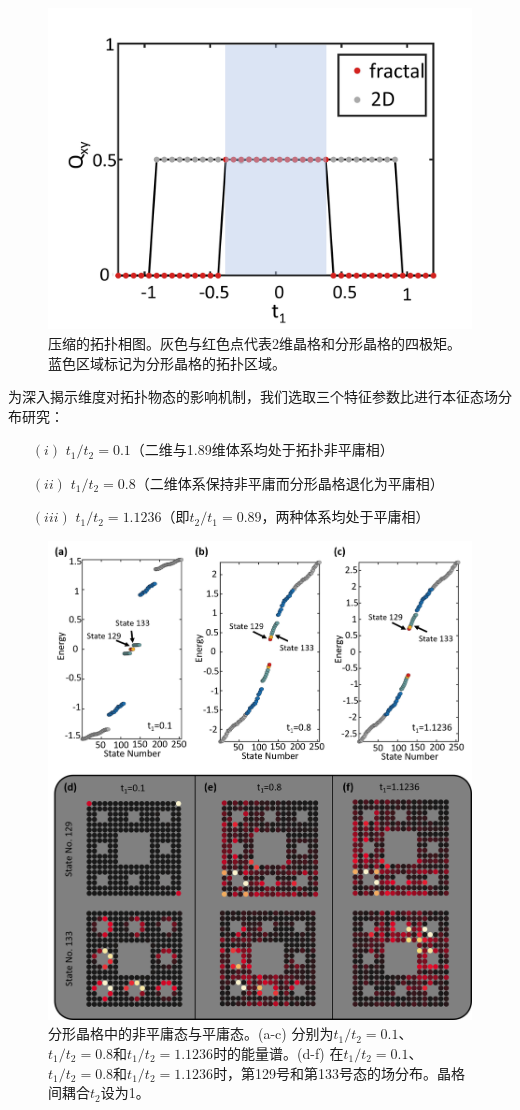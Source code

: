 \begin{figure}[htbp]
    \centering
    \includegraphics[width=0.5\linewidth]{figure/HOTITheo/Quadrupole.png}
    \caption{压缩的拓扑相图。灰色与红色点代表2维晶格和分形晶格的四极矩。蓝色区域标记为分形晶格的拓扑区域。}
    \label{fig:Quadrupole}
\end{figure}

为深入揭示维度对拓扑物态的影响机制，我们选取三个特征参数比进行本征态场分布研究：
\begin{itemize}
    \item [$(i)$] $t_1/t_2=0.1$（二维与1.89维体系均处于拓扑非平庸相）
    \item [$(ii)$] $t_1/t_2=0.8$（二维体系保持非平庸而分形晶格退化为平庸相）
    \item [$(iii)$] $t_1/t_2=1.1236$（即$t_2/t_1=0.89$，两种体系均处于平庸相）
\end{itemize}

\begin{figure}[htbp]
    \centering
    \includegraphics[width=0.75\linewidth]{figure/HOTITheo/Transition.png}
    \caption{分形晶格中的非平庸态与平庸态。(a-c) 分别为$t_1/t_2=0.1$、$t_1/t_2=0.8$和$t_1/t_2=1.1236$时的能量谱。(d-f) 在$t_1/t_2=0.1$、$t_1/t_2=0.8$和$t_1/t_2=1.1236$时，第129号和第133号态的场分布。晶格间耦合$t_2$设为1。}
    \label{fig:Transition}
\end{figure}


